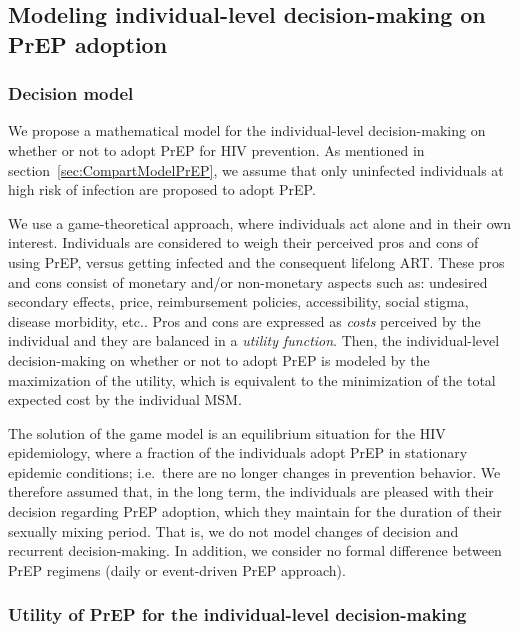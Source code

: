 \documentclass[11pt]{article}
\begin{document}
\subsection{Modeling individual-level decision-making on PrEP adoption} \label{sec:DecisionMaking}
\subsubsection{Decision model} \label{sec:DecisionModel}

We propose a mathematical model for the individual-level decision-making on whether or not to adopt PrEP for HIV prevention. As mentioned in section~\ref{sec:CompartModelPrEP}, we assume that only uninfected individuals at high risk of infection are proposed to adopt PrEP. 

We use a game-theoretical approach, where individuals act alone and in their own interest. Individuals are considered to weigh their perceived pros and cons of using PrEP, versus getting infected and the consequent lifelong ART. These pros and cons consist of monetary and/or non-monetary aspects such as: undesired secondary effects, price, reimbursement policies, accessibility, social stigma, disease morbidity, etc.\cite{Arnold2016,Gilson2018,Thomann2017,Brooks2019}. Pros and cons are expressed as {\it costs} perceived by the individual and they are balanced in a {\it utility function}. Then, the individual-level decision-making on whether or not to adopt PrEP is modeled by the maximization of the utility, which is equivalent to the minimization of the total expected cost by the individual MSM.

The solution of the game model is an equilibrium situation for the HIV epidemiology, where a fraction of the individuals adopt PrEP in stationary epidemic conditions; i.e.~there are no longer changes in prevention behavior. We therefore assumed that, in the long term, the individuals are pleased with their decision regarding PrEP adoption, which they maintain for the duration of their sexually mixing period. That is, we do not model changes of decision and recurrent decision-making. In addition, we consider no formal difference between PrEP regimens (daily or event-driven PrEP approach).  


\subsubsection{Utility of PrEP for the individual-level decision-making} \label{sec:Utility}
\end{document}
